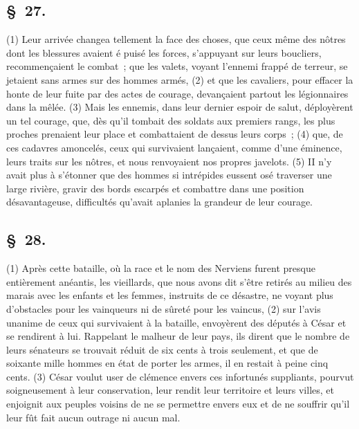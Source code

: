 \documentclass[french,twoside]{book} %
\begin{document}
\subsection[{§ 27.}]{ \textsc{§ 27.} }
\noindent (1) Leur arrivée changea tellement la face des choses, que ceux même des nôtres dont les blessures avaient é puisé les forces, s’appuyant sur leurs boucliers, recommençaient le combat ; que les valets, voyant l’ennemi frappé de terreur, se jetaient sans armes sur des hommes armés, (2) et que les cavaliers, pour effacer la honte de leur fuite par des actes de courage, devançaient partout les légionnaires dans la mêlée. (3) Mais les ennemis, dans leur dernier espoir de salut, déployèrent un tel courage, que, dès qu’il tombait des soldats aux premiers rangs, les plus proches prenaient leur place et combattaient de dessus leurs corps ; (4) que, de ces cadavres amoncelés, ceux qui survivaient lançaient, comme d’une éminence, leurs traits sur les nôtres, et nous renvoyaient nos propres javelots. (5) II n’y avait plus à s’étonner que des hommes si intrépides eussent osé traverser une large rivière, gravir des bords escarpés et combattre dans une position désavantageuse, difficultés qu’avait aplanies la grandeur de leur courage.
\subsection[{§ 28.}]{ \textsc{§ 28.} }
\noindent (1) Après cette bataille, où la race et le nom des Nerviens furent presque entièrement anéantis, les vieillards, que nous avons dit s’être retirés au milieu des marais avec les enfants et les femmes, instruits de ce désastre, ne voyant plus d’obstacles pour les vainqueurs ni de sûreté pour les vaincus, (2) sur l’avis unanime de ceux qui survivaient à la bataille, envoyèrent des députés à César et se rendirent à lui. Rappelant le malheur de leur pays, ils dirent que le nombre de leurs sénateurs se trouvait réduit de six cents à trois seulement, et que de soixante mille hommes en état de porter les armes, il en restait à peine cinq cents. (3) César voulut user de clémence envers ces infortunés suppliants, pourvut soigneusement à leur conservation, leur rendit leur territoire et leurs villes, et enjoignit aux peuples voisins de ne se permettre envers eux et de ne souffrir qu’il leur fût fait aucun outrage ni aucun mal.
\end{document}
